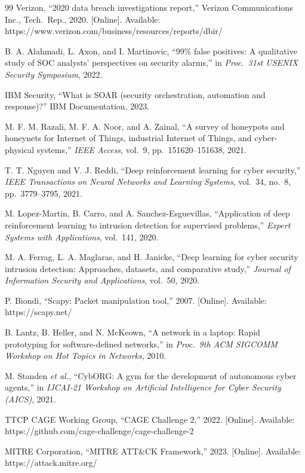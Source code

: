 \documentclass[12pt,a4paper]{report}
\begin{document}
\begin{thebibliography}{99}
Verizon, ``2020 data breach investigations report,'' Verizon Communications Inc., Tech.\ Rep., 2020. [Online]. Available: https://www.verizon.com/business/resources/reports/dbir/

B. A. Alahmadi, L. Axon, and I. Martinovic, ``99\% false positives: A qualitative study of SOC analysts' perspectives on security alarms,'' in \textit{Proc.\ 31st USENIX Security Symposium}, 2022.

IBM Security, ``What is SOAR (security orchestration, automation and response)?'' IBM Documentation, 2023.

M. F. M. Razali, M. F. A. Noor, and A. Zainal, ``A survey of honeypots and honeynets for Internet of Things, industrial Internet of Things, and cyber-physical systems,'' \textit{IEEE Access}, vol.\ 9, pp.\ 151620--151638, 2021.

T. T. Nguyen and V. J. Reddi, ``Deep reinforcement learning for cyber security,'' \textit{IEEE Transactions on Neural Networks and Learning Systems}, vol.\ 34, no.\ 8, pp.\ 3779--3795, 2021.

M. Lopez-Martin, B. Carro, and A. Sanchez-Esguevillas, ``Application of deep reinforcement learning to intrusion detection for supervised problems,'' \textit{Expert Systems with Applications}, vol.\ 141, 2020.

M. A. Ferrag, L. A. Maglaras, and H. Janicke, ``Deep learning for cyber security intrusion detection: Approaches, datasets, and comparative study,'' \textit{Journal of Information Security and Applications}, vol.\ 50, 2020.

P. Biondi, ``Scapy: Packet manipulation tool,'' 2007. [Online]. Available: https://scapy.net/

B. Lantz, B. Heller, and N. McKeown, ``A network in a laptop: Rapid prototyping for software-defined networks,'' in \textit{Proc.\ 9th ACM SIGCOMM Workshop on Hot Topics in Networks}, 2010.

M. Standen \textit{et al.}, ``CybORG: A gym for the development of autonomous cyber agents,'' in \textit{IJCAI-21 Workshop on Artificial Intelligence for Cyber Security (AICS)}, 2021.

TTCP CAGE Working Group, ``CAGE Challenge 2,'' 2022. [Online]. Available: https://github.com/cage-challenge/cage-challenge-2

MITRE Corporation, ``MITRE ATT\&CK Framework,'' 2023. [Online]. Available: https://attack.mitre.org/

\end{thebibliography}
\end{document}
